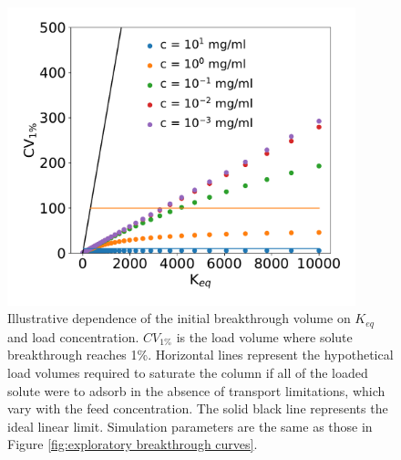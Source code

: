 \documentclass[11pt,a4paper]{article}
\providecommand{\DIFaddtex}[1]{{\protect\color{blue} \sf #1}} %
\providecommand{\DIFaddFL}[1]{\DIFadd{#1}} %
\providecommand{\DIFaddbeginFL}{} %
\providecommand{\DIFaddendFL}{} %
\providecommand{\DIFdelbeginFL}{} %
\providecommand{\DIFdelendFL}{} %
\providecommand{\DIFadd}[1]{\texorpdfstring{\DIFaddtex{#1}}{#1}} %
\begin{document}
\begin{figure}[bp]
    \centering
    \DIFdelbeginFL %
\DIFdelendFL \DIFaddbeginFL \includegraphics[width=0.9\textwidth]{figure_2}
    \DIFaddendFL \caption{Illustrative dependence of the initial breakthrough volume on $K_{eq}$ and load concentration. $CV_{1\%}$ is the load volume where solute breakthrough reaches 1\%. Horizontal lines represent the hypothetical load volumes required to saturate the column \DIFaddbeginFL \DIFaddFL{if all of the loaded solute were to adsorb in the absence of transport limitations}\DIFaddendFL , which vary with the feed concentration. The solid black line represents the ideal linear limit. \DIFaddbeginFL \DIFaddFL{Simulation parameters are the same as those in Figure \ref{fig:exploratory breakthrough curves}.}\DIFaddendFL }
    \label{fig:initial breakthrough volumes vs Keq}
\end{figure}
\end{document}
